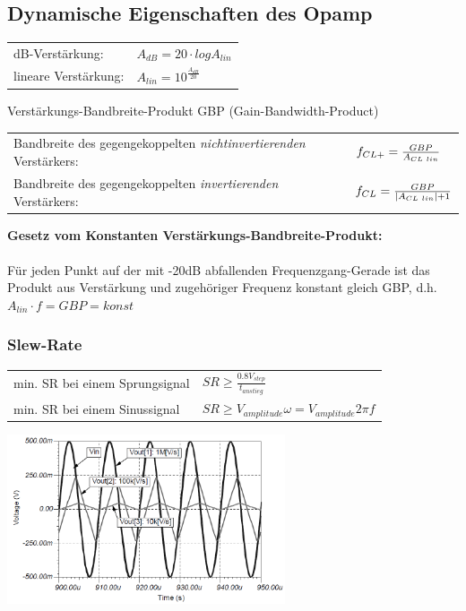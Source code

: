 		\subsection{Dynamische Eigenschaften des Opamp }
			\begin{tabular}{ll}
				dB-Verstärkung:&
        $A_{dB}=20 \cdot log A_{lin}$\\
        lineare Verstärkung:&
        $A_{lin}=10^{\frac{A_{dB}}{20}}$\\
			\end{tabular}
      Verstärkungs-Bandbreite-Produkt GBP (Gain-Bandwidth-Product)\\
      \begin{tabular}{ll}
        Bandbreite des gegengekoppelten {\it nichtinvertierenden} Verstärkers:&
        $f_{CL+}=\frac{GBP}{A_{CL \hspace{1mm}lin}}$\\
        Bandbreite des gegengekoppelten {\it invertierenden} Verstärkers: &
        $f_{CL}=\frac{GBP}{\left| A_{CL \hspace{1mm}lin}\right|+1}$\\
      \end{tabular}
      {\bf Gesetz vom Konstanten Verstärkungs-Bandbreite-Produkt:} \\ \\
      	Für jeden Punkt auf der mit -20dB abfallenden Frequenzgang-Gerade ist das
        Produkt aus Verstärkung und zugehöriger Frequenz konstant gleich GBP, d.h. $A_{lin}\cdot f=GBP=konst$\\
      
		\subsubsection{Slew-Rate}
		\begin{tabular}{ll}
			min. SR bei einem Sprungsignal &
			$SR\geq\frac{0.8V_{step}}{t_{anstieg}}$\\ 
			min. SR bei einem Sinussignal & 
			$SR\geq V_{amplitude}\omega=V_{amplitude}2\pi f$\\
		\end{tabular}

		\includegraphics[height=5cm]{./bilder/slew-rate.png}\\